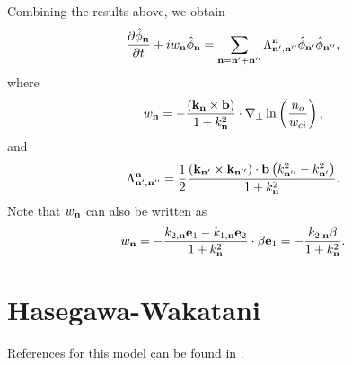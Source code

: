 \documentclass[oneside,a4paper,11pt]{report}
\begin{document}
Combining the results above, we obtain
\begin{equation}
    \frac{\partial \hat{\phi}_{\mathbf{n}}}{\partial t} + i w_{\mathbf{n}} \hat{\phi}_{\mathbf{n}} = \sum_{\mathbf{n} = \mathbf{n}' + \mathbf{n}''} \Lambda^{\mathbf{n}}_{\mathbf{n}', \mathbf{n}''} \hat{\phi}_{\mathbf{n}'} \hat{\phi}_{\mathbf{n}''},
\end{equation}
where
\begin{equation}
    w_{\mathbf{n}} = - \frac{ \left (\mathbf{k}_{\mathbf{n}} \times \mathbf{b} \right ) }{1 + k^2_{\mathbf{n}}} \cdot \nabla_\perp \ln \left ( \frac{n_o}{w_{ci}} \right ),
\end{equation}
and
\begin{equation}
    \Lambda^{\mathbf{n}}_{\mathbf{n}', \mathbf{n}''} = \frac{1}{2} \frac{  \left ( \mathbf{k}_{\mathbf{n}'} \times \mathbf{k}_{\mathbf{n}''} \right ) \cdot \mathbf{b} \left ( k^2_{\mathbf{n}''} - k^2_{\mathbf{n}'} \right ) }{1 + k^2_{\mathbf{n}}}.
\end{equation}
Note that $w_{\mathbf{n}}$ can also be written as
\begin{equation}
    w_{\mathbf{n}} = -\frac{k_{2,\mathbf{n}} \mathbf{e}_1 - k_{1,\mathbf{n}} \mathbf{e}_2}{1 + k^2_{\mathbf{n}}} \cdot \beta \mathbf{e}_1 = -\frac{k_{2,\mathbf{n}} \beta}{1 + k^2_{\mathbf{n}}}.
\end{equation}

\section{Hasegawa-Wakatani}
References for this model can be found in \cite{wakatani1984,hasegawa1987}.

\end{document}
